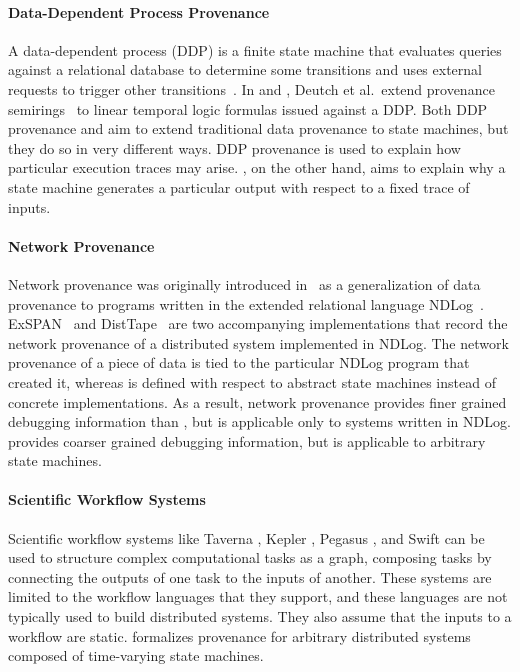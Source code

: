 \paragraph{Data-Dependent Process Provenance}
A data-dependent process (DDP) is a finite state machine that evaluates queries
against a relational database to determine some transitions and uses external
requests to trigger other transitions~\cite{deutch2014provenance,
deutch2015provenance}. In \cite{deutch2014provenance} and
\cite{deutch2015provenance}, Deutch et al.\ extend provenance
semirings~\cite{green2007provenance} to linear temporal logic formulas issued
against a DDP.
%
Both DDP provenance and \watprovenance{} aim to extend traditional data
provenance to state machines, but they do so in very different ways. DDP
provenance is used to explain how particular execution traces may arise.
\Watprovenance{}, on the other hand, aims to explain why a state machine
generates a particular output with respect to a fixed trace of inputs.

\paragraph{Network Provenance}
Network provenance was originally introduced in~\cite{zhou2010efficient} as a
generalization of data provenance to programs written in the extended
relational language NDLog~\cite{loo2006design}. ExSPAN~\cite{zhou2010efficient}
and DistTape~\cite{zhou2012distributed} are two accompanying implementations
that record the network provenance of a distributed system implemented in
NDLog.
%
The network provenance of a piece of data is tied to the particular NDLog
program that created it, whereas \watprovenance{} is defined with respect to
abstract state machines instead of concrete implementations. As a result,
network provenance provides finer grained debugging information than
\watprovenance{}, but is applicable only to systems written in NDLog.
\Watprovenance{} provides coarser grained debugging information, but is
applicable to arbitrary state machines.

\paragraph{Scientific Workflow Systems}
Scientific workflow systems like Taverna \cite{wolstencroft2013taverna}, Kepler
\cite{altintas2006provenance}, Pegasus \cite{kim2008provenance}, and Swift
\cite{wozniak2013swift} can be used to structure complex computational tasks as
a graph, composing tasks by connecting the outputs of one task to the inputs of
another. These systems are limited to the workflow languages that they support,
and these languages are not typically used to build distributed systems. They
also assume that the inputs to a workflow are static. \Watprovenance{}
formalizes provenance for arbitrary distributed systems composed of
time-varying state machines.

